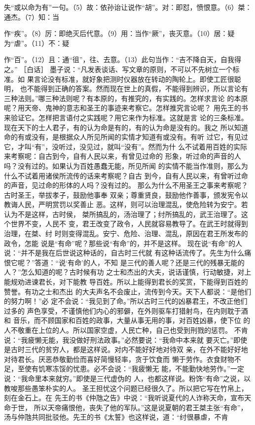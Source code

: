 \documentclass[12pt,UTF8]{ctexbook}
\begin{document}
失“或以命为有”一句。（5）故：依孙诒让说作“胡”。对：即怼，愤恨意。（6）桀：通杰。（7）知：当 

作“疾”。（8）厉：即绝灭后代意。（9）用：当作“厥”，丧灭意。（10）居：疑为“虐”。（11）不：疑 

作“百”。（12）且：通“徂”，往、去意。（13）此句当作：“吉不降自天，自我得之。” 
［白话］ 
墨子说：“凡发表谈话、写文章的原则，不可以不先树立一个标准。如 
果言论没有标准，就好象把测时仪器放在转动的陶轮上。即使工匠很聪明， 
也不能得到正确的答案。然而现在世上的真假，不能得到辨识，所以言论有 
三种法则。”哪三种法则呢？有本原的，有推究的，有实践的。怎样求言论 
的本原呢？用天帝、鬼神的意志和圣王的事迹来考察它。怎样推究言论呢？ 
用先王的书来验证它。怎样把言语付之实践呢？用它来作为标准。这就是言 
论的三条标准。 
现在天下的士人君子，有的认为命是有的，有的认为命是没有的。我之 
所以知道命的有或没有，是根据众人所见所闻的实情才知道有或没有。有听 
过它，有见过它，才叫“有”，没听过，没见过，就叫“没有”。然而为什 
么不试着用百姓的实际来考察呢：自古到今，自有人民以来，有曾见过命的 
形象，听过命的声音的人吗？没有过的。如果认为百姓愚蠢无能，所见所闻 
的实情不能当作准则，那么为什么不试着用诸侯所流传的话来考察呢？自古 
到今，自有人民以来，有曾听过命的声音，见过命的形体的人吗？没有过的。 
那么为什么不用圣王之事来考察呢？古时圣王，举拔孝子，鼓励他事奉 
双亲；尊重贤良，鼓励他作善事，颁发宪令以教诲人民，严明赏罚以奖善止 
恶。这样，则可以治理混乱，使危险转为安宁。若认为不是这样，古时侯， 
桀所搞乱的，汤治理了；纣所搞乱的，武王治理了。这个世界不变，人民不 
变，君王改变了政令，人民就容易教导了。在武王时就得到治理，在桀、纣 
时则变得混乱。安宁、危险、治理、混乱，原因在君王所发布的政令，怎能 
说是“有命”呢？那些说“有命”的，并不是这样。 
现在说“有命”的人说：“并不是我在后世说这种话的，自古时三代就 
有这种话流传了。先生为什么痛恨它呢？”答道：“说‘有命’的人，不知 
是三代的善人呢？还是三代的残暴无能的人？”怎么知道的呢？古时候有功 
之士和杰出的大夫，说话谨慎，行动敏捷，对上能规劝进谏君长，对下能教 
导百姓。所以上能得到君长的奖赏，下能得到百姓的赞誉。有功之士和杰出 
的大夫声名不会废止，流传到今天。天下人都说：“是他们的努力啊！”必 
定不会说：“我见到了命。”所以古时三代的凶暴君王，不改正他们过多的 
声色享受，不谨慎他们内心的邪僻，在外则驱车打猎射鸟，在内则耽于酒和 
音乐，而不顾国家和百姓的政事，大量从事无用的事，对百姓凶暴，使下位 
的人不敬重在上位的人。所以国家空虚，人民亡种，自己也受到刑戮的惩罚。 
不肯说：“我疲懒无能，我没做好刑法政事。”必然要说：“我命中本来就 
要灭亡。”即使是古时三代的贫穷人，都是这样说。对内不能好好地对待双 
亲，在外不能好好地对待君长。厌恶恭敬勤俭而喜好简慢轻率，贪于饮食而 
懒于劳作。衣食财物不足，至使有饥寒冻馁的忧患。必不会说：“我疲懒无 
能，不能勤快地劳作。”一定说：“我命里本来就穷。”即使是三代虚伪的 
人，也都这样说。粉饰“有命”之说，以教唆那些愚笨朴实的人。 
圣王担忧这个问题已经很久了。所以把它写在竹帛上，刻在金石上。在 
先王的书《仲虺之告》中说：“我听说夏代的人诈称天命，宣布天命于世， 
所以天帝痛恨他，丧失了他的军队。”这是说夏朝的君王桀主张“有命”， 
汤与仲虺共同批驳他。先王的书《太誓》也这样说，道：“纣很暴虐，不肯 
\end{document}
